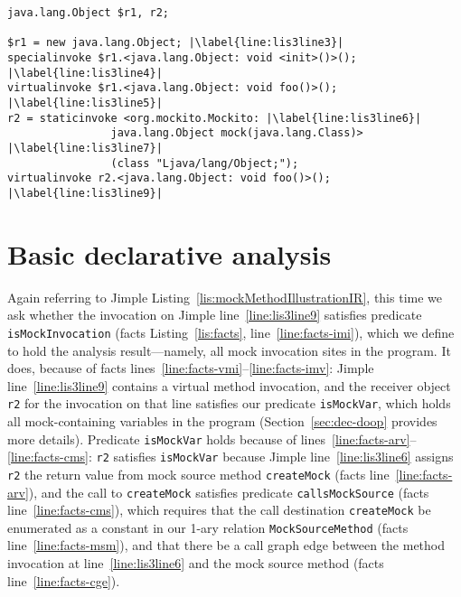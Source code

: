 \begin{lstlisting}[basicstyle=\ttfamily, caption={Jimple Intermediate Representation for the code in Figure~\ref{fig:mockMethodIllustration}.},
basicstyle=\ttfamily, captionpos=b, label=lis:mockMethodIllustrationIR, escapechar=|, morekeywords={@Test, specialinvoke, virtualinvoke, staticinvoke}]
java.lang.Object $r1, r2;

$r1 = new java.lang.Object; |\label{line:lis3line3}|
specialinvoke $r1.<java.lang.Object: void <init>()>(); |\label{line:lis3line4}|
virtualinvoke $r1.<java.lang.Object: void foo()>(); |\label{line:lis3line5}|
r2 = staticinvoke <org.mockito.Mockito: |\label{line:lis3line6}|
				java.lang.Object mock(java.lang.Class)> |\label{line:lis3line7}|
				(class "Ljava/lang/Object;");
virtualinvoke r2.<java.lang.Object: void foo()>(); |\label{line:lis3line9}|
\end{lstlisting}

\section{Basic declarative analysis} 
\label{sec:motivating-example-dec}

Again referring to Jimple Listing~\ref{lis:mockMethodIllustrationIR}, this time we ask whether the invocation on Jimple line~\ref{line:lis3line9} satisfies predicate \texttt{isMockInvocation} (facts Listing~\ref{lis:facts}, line~\ref{line:facts-imi}), which we define to hold the analysis result---namely, all mock invocation sites in the program. It does, because of facts lines~\ref{line:facts-vmi}--\ref{line:facts-imv}: Jimple line~\ref{line:lis3line9} contains a virtual method invocation, and the receiver object \texttt{r2} for the invocation on that line satisfies our predicate \texttt{isMockVar}, which holds all mock-containing variables in the program (Section~\ref{sec:dec-doop} provides more details). Predicate \texttt{isMockVar} holds because of lines~\ref{line:facts-arv}--\ref{line:facts-cms}: \texttt{r2} satisfies \texttt{isMockVar} because Jimple line~\ref{line:lis3line6} assigns \texttt{r2} the return value from mock source method \texttt{createMock} (facts line~\ref{line:facts-arv}), and the call to \texttt{createMock} satisfies predicate \texttt{callsMockSource} (facts line~\ref{line:facts-cms}), which requires that the call destination \texttt{createMock} be enumerated as a constant in our 1-ary relation \texttt{MockSourceMethod} (facts line~\ref{line:facts-msm}), and that there be a call graph edge between the method invocation at line~\ref{line:lis3line6} and the mock source method (facts line~\ref{line:facts-cge}).


